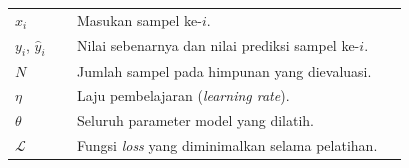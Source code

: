 %
%


\begin{longtable}{@{}p{0.15\linewidth}p{0.80\linewidth}@{}}
$x_i$ & Masukan sampel ke-$i$. \\
$y_i$, $\hat{y}_i$ & Nilai sebenarnya dan nilai prediksi sampel ke-$i$. \\
$N$ & Jumlah sampel pada himpunan yang dievaluasi. \\
$\eta$ & Laju pembelajaran (\textit{learning rate}). \\
$\theta$ & Seluruh parameter model yang dilatih. \\
$\mathcal{L}$ & Fungsi \textit{loss} yang diminimalkan selama pelatihan. \\
\end{longtable}
